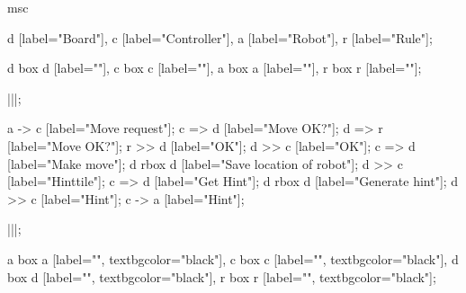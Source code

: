 \begin{msc}
msc
{

d [label="Board"],
c [label="Controller"],
a [label="Robot"],
r [label="Rule"];

d box d [label=""],
c box c [label=""],
a box a [label=""],
r box r [label=""];

|||;

a -> c [label="Move request"];
c => d [label="Move OK?"];
d => r [label="Move OK?"];
r >> d [label="OK"];
d >> c [label="OK"];
c => d [label="Make move"];
d rbox d [label="Save location of robot"];
d >> c [label="Hinttile"];
c => d [label="Get Hint"];
d rbox d [label="Generate hint"];
d >> c [label="Hint"];
c -> a [label="Hint"];

|||;

a box a [label="", textbgcolor="black"],
c box c [label="", textbgcolor="black"],
d box d [label="", textbgcolor="black"],
r box r [label="", textbgcolor="black"];

}
\end{msc}
